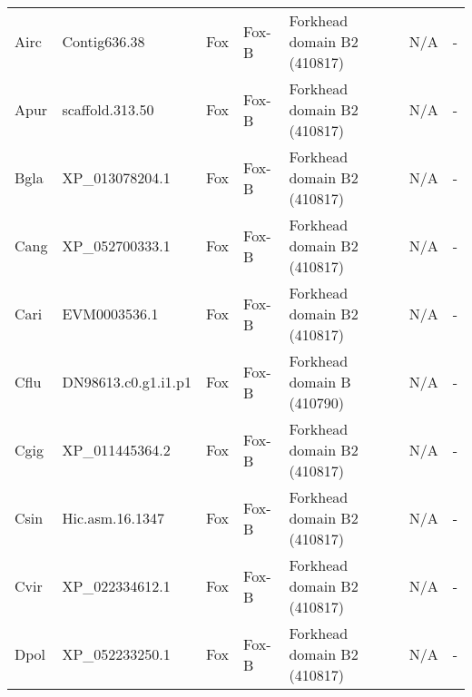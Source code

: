\documentclass[../main.tex]{subfiles}
\begin{document}
\begin{landscape}
\begin{longtable}{lllllll}
		Airc           & Contig636.38          & Fox            & Fox-B               & Forkhead domain B2 (410817)                 & N/A                                                                    & -                    \\
		Apur           & scaffold.313.50       & Fox            & Fox-B               & Forkhead domain B2 (410817)                 & N/A                                                                    & -                    \\
		Bgla           & XP\_013078204.1       & Fox            & Fox-B               & Forkhead domain B2 (410817)                 & N/A                                                                    & -                    \\
		Cang           & XP\_052700333.1       & Fox            & Fox-B               & Forkhead domain B2 (410817)                 & N/A                                                                    & -                    \\
		Cari           & EVM0003536.1          & Fox            & Fox-B               & Forkhead domain B2 (410817)                 & N/A                                                                    & -                    \\
		Cflu           & DN98613.c0.g1.i1.p1   & Fox            & Fox-B               & Forkhead domain B (410790)                  & N/A                                                                    & -                    \\
		Cgig           & XP\_011445364.2       & Fox            & Fox-B               & Forkhead domain B2 (410817)                 & N/A                                                                    & -                    \\
		Csin           & Hic.asm.16.1347       & Fox            & Fox-B               & Forkhead domain B2 (410817)                 & N/A                                                                    & -                    \\
		Cvir           & XP\_022334612.1       & Fox            & Fox-B               & Forkhead domain B2 (410817)                 & N/A                                                                    & -                    \\
		Dpol           & XP\_052233250.1       & Fox            & Fox-B               & Forkhead domain B2 (410817)                 & N/A                                                                    & -                    \\

\end{longtable}
\end{landscape}
\end{document}
